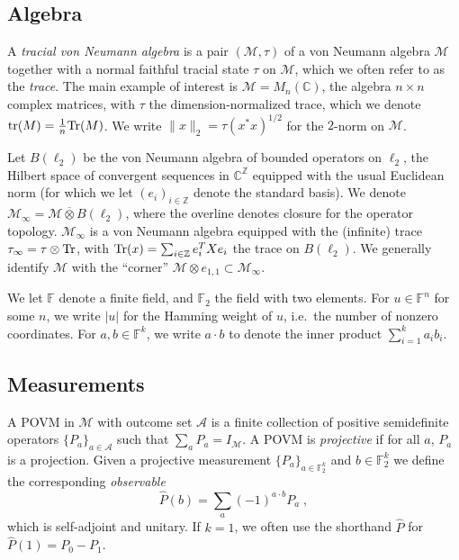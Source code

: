 \documentclass[11pt]{article}
\theoremstyle{definition}
\newcommand{\Tr}{\mbox{\rm Tr}}
\newcommand{\Id}{\ensuremath{I}}
\newcommand{\field}{\mathbb{F}_2}
\newcommand{\C}{\ensuremath{\mathbb{C}}}
\newcommand{\F}{\ensuremath{\mathbb{F}}}
\newcommand{\Z}{\ensuremath{\mathbb{Z}}}
\newcommand{\mA}{\ensuremath{\mathcal{A}}}
\newcommand{\mM}{\ensuremath{\mathcal{M}}}
\DeclareMathOperator{\tr}{tr}
\begin{document}
\subsection{Algebra}

  A \emph{tracial von Neumann algebra} is a pair $(\mM,\tau)$ of a von Neumann algebra $\mM$ together with a normal faithful tracial state $\tau$ on $\mM$, which we often refer to as the \emph{trace}. The main example of interest is $\mM=M_n(\C)$, the algebra $n\times n$ complex matrices, with $\tau$ the dimension-normalized trace, which we denote $\tr(M)=\frac{1}{n}\Tr(M)$. 	We write $\|x\|_2=\tau(x^*x)^{1/2}$ for the $2$-norm on $\mM$.
	
	Let $B(\ell_2)$ be the von Neumann algebra of bounded operators on $\ell_2$, the Hilbert space of convergent sequences in $\C^\Z$ equipped with the usual Euclidean norm (for which we let $(e_i)_{i \in \Z}$ denote the standard basis). We denote $\mM_\infty = \mM \overline{\otimes} B(\ell_2)$, where the overline denotes closure for the operator topology. $\mM_\infty$ is a von Neumann algebra equipped with the (infinite) trace $\tau_\infty = \tau \otimes \Tr$, with $\Tr(x)=\sum_{i\in \Z} e_i^T X e_i$ the trace on $B(\ell_2)$. We generally identify $\mM$ with the ``corner'' $\mM\otimes e_{1,1}\subset \mM_\infty$. 

	We let $\F$ denote a finite field, and $\field$ the field with two elements. For $u\in \F^n$ for some $n$, we write $|u|$ for the Hamming weight of $u$, i.e.\ the number of nonzero coordinates. For $a,b \in \F^k$, we write $a \cdot b$ to denote the inner product $\sum_{i=1}^k a_i b_i$. 
	
	
	\subsection{Measurements}
	\label{sec:measurements}
	
	A POVM in $\mM$ with outcome set $\mA$ is a finite collection of positive semidefinite operators $\{P_a\}_{a\in \mA}$ such that $\sum_a P_a = \Id_\mM$. A POVM is \emph{projective} if for all $a$, $P_a$ is a projection. 
	Given a projective measurement $\{P_a\}_{a\in \field^k}$ and $b\in \field^k$ we define the corresponding \emph{observable} 
	\[ \widehat{P}(b) = \sum_a (-1)^{a\cdot b} P_a\;,\]
	which is self-adjoint and unitary. If $k=1$, we often use the shorthand $\widehat{P}$ for $\widehat{P}(1) = P_0-P_1$.
	
\end{document}

